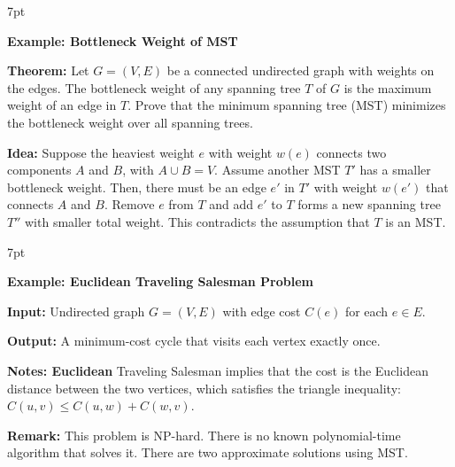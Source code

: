 \documentclass[10pt]{article}
\newenvironment{formal}[2]{%
	\def\FrameCommand{%
		\hspace{1pt}%
		{\color{#1}\vrule width 2pt}%
		{\color{#2}\vrule width 4pt}%
		\colorbox{#2}%
	}%
	\MakeFramed{\advance\hsize-\width\FrameRestore}%
	\noindent\hspace{-4.55pt}%
	\begin{adjustwidth}{}{7pt}%
		\vspace{2pt}\vspace{2pt}%
	}
	{%
		\vspace{2pt}\end{adjustwidth}\endMakeFramed%
}
\begin{document}
\begin{formal}{Brown}{brownshade}

	\textbf{Example: Bottleneck Weight of MST}

	\textbf{Theorem:} Let $G = (V,E)$ be a connected undirected graph with weights on the edges. The bottleneck weight of any spanning tree $T$ of $G$ is the maximum weight of an edge in $T$. Prove that the minimum spanning tree (MST) minimizes the bottleneck weight over all spanning trees.

	\textbf{Idea:} Suppose the heaviest weight $e$ with weight $w(e)$ connects two components $A$ and $B$, with $A \cup B = V$. Assume another MST $T'$ has a smaller bottleneck weight. Then, there must be an edge $e'$ in $T'$ with weight $w(e')$ that connects $A$ and $B$. Remove $e$ from $T$ and add $e'$ to $T$ forms a new spanning tree $T''$ with smaller total weight. This contradicts the assumption that $T$ is an MST.

\end{formal}

\begin{formal}{Brown}{brownshade}

	\textbf{Example: Euclidean Traveling Salesman Problem}

	\textbf{Input:} Undirected graph $G = (V, E)$ with edge cost $C(e)$ for each $e \in E$.

	\textbf{Output:} A minimum-cost cycle that visits each vertex exactly once.

	\textbf{Notes: Euclidean} Traveling Salesman implies that the cost is the Euclidean distance between the two vertices, which satisfies the triangle inequality: $C(u, v) \leq C(u, w) + C(w, v)$.

	\textbf{Remark:} This problem is NP-hard. There is no known polynomial-time algorithm that solves it. There are two approximate solutions using MST.

\end{formal}
\end{document}
